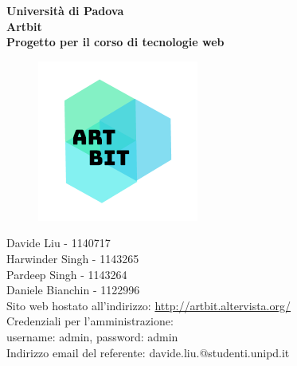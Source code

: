 \documentclass[openany, a4paper, 12pt]{report}
\begin{document}
	\begin{titlepage}
		\centering
		\vfill
		{
			\bfseries
			\vskip2cm
			\Large Università di Padova\\
			\vfill
			\Huge Artbit\\
			\Large Progetto per il corso di tecnologie web\\
			\vfill
			
			\begin{figure}[H]
				\centering
				\includegraphics[width=0.6\linewidth]{logo.png}
			\end{figure}
			\large Davide Liu - 1140717 \\ Harwinder Singh - 1143265 \\ Pardeep Singh - 1143264 \\ Daniele Bianchin - 1122996 \\
			\vfill
			Sito web hostato all'indirizzo: \url{http://artbit.altervista.org/}\\
			{\small Credenziali per l'amministrazione:\\username: admin, password: admin\\}
			\vfill
			Indirizzo email del referente: davide.liu.@studenti.unipd.it\\
			\vfill
		}
	\end{titlepage}
	\tableofcontents
	\newpage

\end{document}
